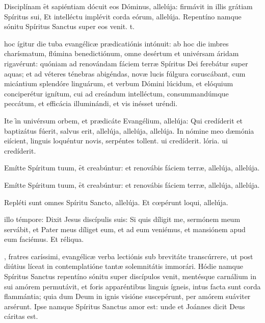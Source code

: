 \documentclass[fontsize=9pt,paper=A6,twoside,BCOR=1mm,DIV=22,headinclude]{scrarticle}
\begin{document}
\begin{multicols}{2}
{\R Disciplínam \f et sapiéntiam dócuit eos Dóminus, allelúja: firmávit in illis grátiam Spíritus sui,
\red{*} Et intelléctu implévit corda eórum, allelúja.
\V Repentíno namque sónitu Spíritus Sanctus super eos venit.
t.

 hoc ígitur die tuba evangélicæ prædicatiónis intónuit: ab hoc die imbres charísmatum, flúmina benedictiónum, omne desértum et univérsam áridam rigavérunt: quóniam ad renovándam fáciem terræ Spíritus Dei ferebátur super aquas; et ad véteres ténebras abigéndas, novæ lucis fúlgura coruscábant, cum micántium splendóre linguárum, et verbum Dómini lúcidum, et elóquium conciperétur ignítum, cui ad creándum intelléctum, consummandúmque peccátum, et efficácia illuminándi, et vis inésset uréndi.

\R Ite \f in univérsum orbem, et prædicáte Evangélium, allelúja:
\red{*} Qui credíderit et baptizátus fúerit, salvus erit, allelúja, allelúja, allelúja.
\V In nómine meo dæmónia eiícient, linguis loquéntur novis, serpéntes tollent.
ui credíderit.
lória.
ui credíderit.


\A Emítte Spíritum tuum, \f et creabúntur: et renovábis fáciem terræ, allelúja, allelúja.
}







\A Emítte Spíritum tuum, \f et creabúntur: et renovábis fáciem terræ, allelúja, allelúja.

\V Repléti sunt omnes Spíritu Sancto, allelúja.
\R Et cœpérunt loqui, allelúja.

 illo témpore: Dixit Jesus discípulis suis: Si quis díligit me, sermónem meum servábit, et Pater meus díliget eum, et ad eum veniémus, et mansiónem apud eum faciémus. Et réliqua.

, fratres caríssimi, evangélicæ verba lectiónis sub brevitáte transcúrrere, ut post diútius líceat in contemplatióne tantæ solemnitátis immorári. Hódie namque Spíritus Sanctus repentíno sónitu super discípulos venit, mentésque carnálium in sui amórem permutávit, et foris apparéntibus linguis ígneis, intus facta sunt corda flammántia; quia dum Deum in ignis visióne suscepérunt, per amórem suáviter arsérunt. Ipse namque Spíritus Sanctus amor est: unde et Joánnes dicit Deus cáritas est.


\end{multicols}
\end{document}
